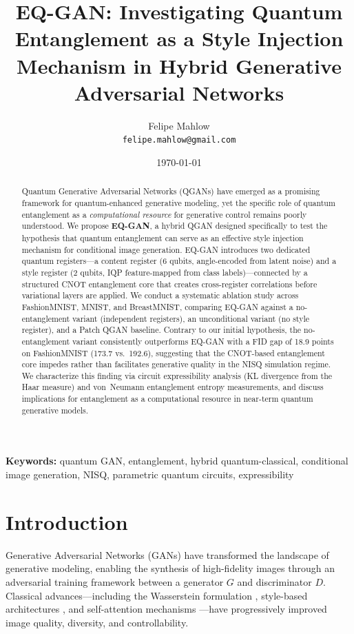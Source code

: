 \documentclass[twocolumn]{article}
\title{\textbf{EQ-GAN: Investigating Quantum Entanglement as a Style Injection\\
Mechanism in Hybrid Generative Adversarial Networks}}
\author{
  Felipe Mahlow\\
  \small \texttt{felipe.mahlow@gmail.com}
}
\date{\today}
\begin{document}
\maketitle

\begin{abstract}
Quantum Generative Adversarial Networks (QGANs) have emerged as a promising
framework for quantum-enhanced generative modeling, yet the specific role of
quantum entanglement as a \emph{computational resource} for generative control
remains poorly understood. We propose \textbf{EQ-GAN}, a hybrid QGAN designed
specifically to test the hypothesis that quantum entanglement can serve as an
effective style injection mechanism for conditional image generation.
EQ-GAN introduces two dedicated quantum registers—a content register
(6 qubits, angle-encoded from latent noise) and a style register (2 qubits,
IQP feature-mapped from class labels)—connected by a structured CNOT
entanglement core that creates cross-register correlations before variational
layers are applied. We conduct a systematic ablation study across FashionMNIST,
MNIST, and BreastMNIST, comparing EQ-GAN against a no-entanglement variant
(independent registers), an unconditional variant (no style register), and a
Patch QGAN baseline. Contrary to our initial hypothesis, the no-entanglement
variant consistently outperforms EQ-GAN with a FID gap of 18.9 points on
FashionMNIST (173.7 vs.\ 192.6), suggesting that the CNOT-based entanglement
core impedes rather than facilitates generative quality in the NISQ simulation
regime. We characterize this finding via circuit expressibility analysis
(KL divergence from the Haar measure) and von~Neumann entanglement entropy
measurements, and discuss implications for entanglement as a computational
resource in near-term quantum generative models.
\end{abstract}

\textbf{Keywords:} quantum GAN, entanglement, hybrid quantum-classical,
conditional image generation, NISQ, parametric quantum circuits, expressibility

\section{Introduction}
\label{sec:intro}

Generative Adversarial Networks (GANs) \cite{goodfellow2014generative} have
transformed the landscape of generative modeling, enabling the synthesis of
high-fidelity images through an adversarial training framework between a
generator $G$ and discriminator $D$. Classical advances—including the
Wasserstein formulation \cite{arjovsky2017wasserstein}, style-based
architectures \cite{karras2019style}, and self-attention mechanisms
\cite{zhang2019self}—have progressively improved image quality, diversity,
and controllability.
\end{document}
